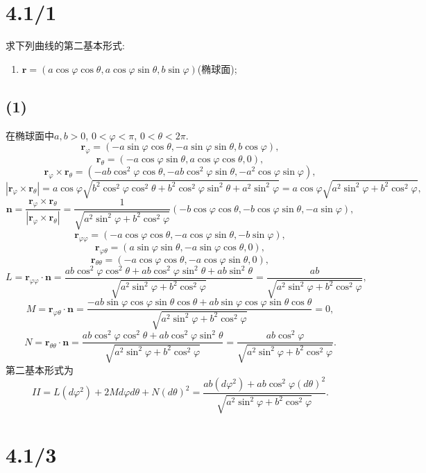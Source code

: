 \documentclass[11pt,a4paper]{article}
\author{刘逸灏 (515370910207)}
\begin{document}
\maketitle

\section{4.1/1}
\begin{problem}
求下列曲线的第二基本形式:
\begin{enumerate}
  \item $\mathbf{r}=(a\cos\varphi\cos\theta,a\cos\varphi\sin\theta,b\sin\varphi)$(椭球面);
\end{enumerate}
\end{problem}

\subsection*{(1)}
在椭球面中$a,b>0$, $0<\varphi<\pi$, $0<\theta<2\pi$.
$$\mathbf{r}_\varphi=(-a\sin\varphi\cos\theta,-a\sin\varphi\sin\theta,b\cos\varphi),$$
$$\mathbf{r}_\theta=(-a\cos\varphi\sin\theta,a\cos\varphi\cos\theta,0),$$
$$\mathbf{r}_\varphi\times\mathbf{r}_\theta=(-ab\cos^2\varphi\cos\theta,-ab\cos^2\varphi\sin\theta,-a^2\cos\varphi\sin\varphi),$$
$$|\mathbf{r}_\varphi\times\mathbf{r}_\theta|=a\cos\varphi\sqrt{b^2\cos^2\varphi\cos^2\theta+b^2\cos^2\varphi\sin^2\theta+a^2\sin^2\varphi}=a\cos\varphi\sqrt{a^2\sin^2\varphi+b^2\cos^2\varphi},$$
$$\mathbf{n}=\frac{\mathbf{r}_\varphi\times\mathbf{r}_\theta}{|\mathbf{r}_\varphi\times\mathbf{r}_\theta|}=\frac{1}{\sqrt{a^2\sin^2\varphi+b^2\cos^2\varphi}}(-b\cos\varphi\cos\theta,-b\cos\varphi\sin\theta,-a\sin\varphi),$$
$$\mathbf{r}_{\varphi\varphi}=(-a\cos\varphi\cos\theta,-a\cos\varphi\sin\theta,-b\sin\varphi),$$
$$\mathbf{r}_{\varphi\theta}=(a\sin\varphi\sin\theta,-a\sin\varphi\cos\theta,0),$$
$$\mathbf{r}_{\theta\theta}=(-a\cos\varphi\cos\theta,-a\cos\varphi\sin\theta,0),$$
$$L=\mathbf{r}_{\varphi\varphi}\cdot\mathbf{n}=\frac{ab\cos^2\varphi\cos^2\theta+ab\cos^2\varphi\sin^2\theta+ab\sin^2\theta}{\sqrt{a^2\sin^2\varphi+b^2\cos^2\varphi}}=\frac{ab}{\sqrt{a^2\sin^2\varphi+b^2\cos^2\varphi}},$$
$$M=\mathbf{r}_{\varphi\theta}\cdot\mathbf{n}=\frac{-ab\sin\varphi\cos\varphi\sin\theta\cos\theta+ab\sin\varphi\cos\varphi\sin\theta\cos\theta}{\sqrt{a^2\sin^2\varphi+b^2\cos^2\varphi}}=0,$$
$$N=\mathbf{r}_{\theta\theta}\cdot\mathbf{n}=\frac{ab\cos^2\varphi\cos^2\theta+ab\cos^2\varphi\sin^2\theta}{\sqrt{a^2\sin^2\varphi+b^2\cos^2\varphi}}=\frac{ab\cos^2\varphi}{\sqrt{a^2\sin^2\varphi+b^2\cos^2\varphi}}.$$
第二基本形式为
$$II=L(d\varphi^2)+2Md\varphi d\theta+N(d\theta)^2=\frac{ab(d\varphi^2)+ab\cos^2\varphi(d\theta)^2}{\sqrt{a^2\sin^2\varphi+b^2\cos^2\varphi}}.$$

\section{4.1/3}
\end{document}
